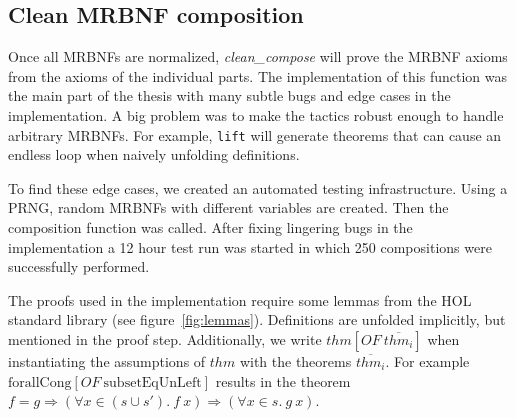 \subsection{Clean \acs{MRBNF} composition}\label{sec:clean_compose}

\newcommand{\OF}[2]{\ensuremath{#1[\textit{OF} \: #2]}}

Once all \acp{MRBNF} are normalized, \textit{clean\_compose} will prove the \ac{MRBNF} axioms from the axioms of the individual parts. The implementation of this function was the main part of the thesis with many subtle bugs and edge cases in the implementation. A big problem was to make the tactics robust enough to handle arbitrary \acp{MRBNF}. For example, \texttt{lift} will generate theorems that can cause an endless loop when naively unfolding definitions.

To find these edge cases, we created an automated testing infrastructure. Using a \ac{PRNG}, random \acp{MRBNF} with different variables are created. Then the composition function was called. After fixing lingering bugs in the implementation a 12 hour test run was started in which 250 compositions were successfully performed.

The proofs used in the implementation require some lemmas from the \ac{HOL} standard library (see figure~\ref{fig:lemmas}). Definitions are unfolded implicitly, but mentioned in the proof step. Additionally, we write $\OF{thm}{\overline{thm_i}}$ when instantiating the assumptions of $thm$ with the theorems $\overline{thm_i}$. For example $\OF{\text{forallCong}}{\text{subsetEqUnLeft}}$ results in the theorem $f = g \Longrightarrow (\forall x \in (s \cup s'). \: f \: x) \Longrightarrow (\forall x \in s. \: g \: x)$.

